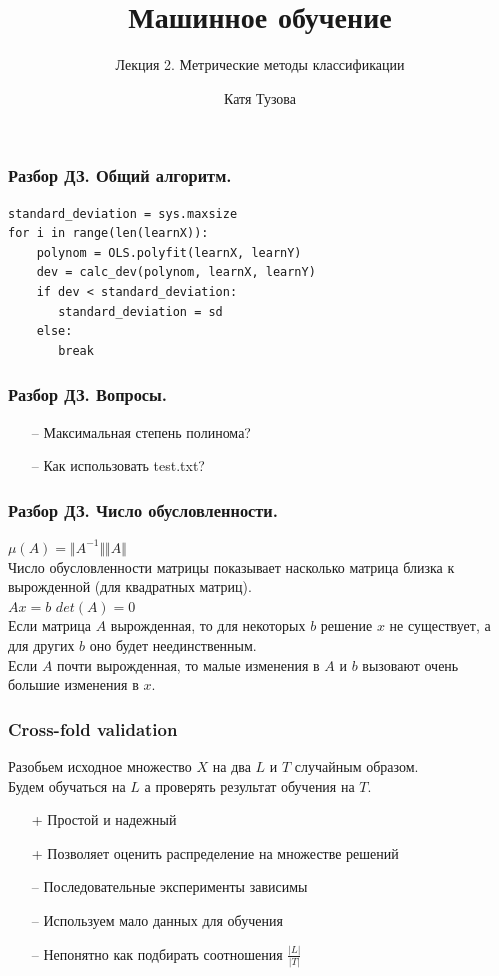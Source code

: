 \documentclass[12pt]{beamer}
\author{Катя Тузова}
\title{Машинное обучение}
\subtitle{Лекция 2. Метрические методы классификации}
\date{}
\begin{document}
\frame{\titlepage}
\begin{frame}[fragile]\frametitle{Разбор ДЗ. Общий алгоритм.}

\begin{lstlisting}[frame=single]
standard_deviation = sys.maxsize
for i in range(len(learnX)):
    polynom = OLS.polyfit(learnX, learnY)
    dev = calc_dev(polynom, learnX, learnY)
    if dev < standard_deviation:
       standard_deviation = sd
    else:
       break
\end{lstlisting}

\end{frame}

\begin{frame}\frametitle{Разбор ДЗ. Вопросы.}
\begin{itemize}
	\item[--] Максимальная степень полинома?
	\item[--] Как использовать test.txt?
\end{itemize}
\end{frame}

\begin{frame}\frametitle{Разбор ДЗ. Число обусловленности.}
${\mu(A) = \Vert A^{-1} \Vert \Vert A \Vert}$\\
\vspace{5mm}
Число обусловленности матрицы показывает насколько матрица близка к вырожденной (для квадратных матриц).\\
\vspace{5mm}
${Ax=b}$  \hspace{15mm}  ${det(A) = 0}$\\
\vspace{5mm}
Если матрица $A$ вырожденная, то для некоторых $b$ решение $x$ не существует, а для других $b$ оно будет неединственным.\\
Если $A$ почти вырожденная, то малые изменения в $A$ и $b$ вызовают очень большие изменения в $x$.

\end{frame}


\begin{frame}\frametitle{Cross-fold validation}
Разобьем исходное множество $X$
на два $L$ и $T$ случайным образом.\\
Будем обучаться на $L$ а проверять результат обучения на $T$.\\
\begin{itemize}
\item[+] Простой и надежный
\item[+] Позволяет оценить распределение на множестве
решений

\end{itemize}
\begin{itemize}
\item[--] Последовательные эксперименты зависимы 
\item[--] Используем мало данных для обучения
\item[--] Непонятно как подбирать соотношения ${\frac{\vert L \vert}{\vert T \vert}}$

\end{itemize}
\end{frame}
\end{document}
